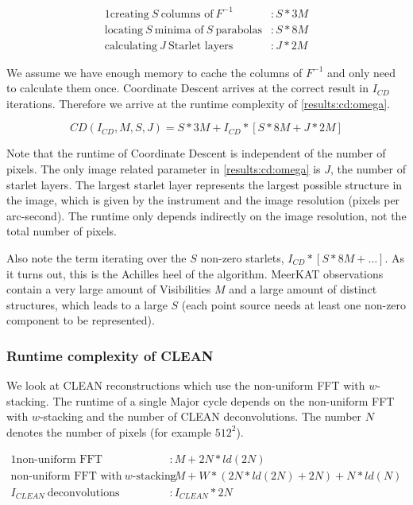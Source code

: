 \begin{alignat*}{1}
\text{creating} \:S\: \text{columns of}\: F^{-1} &: S*3M\\
\text{locating} \:S\: \text{minima of} \:S\: \text{parabolas} &: S*8M\\
\text{calculating} \:J\: \text{Starlet layers} &: J * 2M
\end{alignat*}

We assume we have enough memory to cache the columns of $F^{-1}$ and only need to calculate them once. Coordinate Descent arrives at the correct result in $I_{CD}$ iterations. Therefore we arrive at the runtime complexity of \eqref{results:cd:omega}.

\begin{equation}\label{results:cd:omega}
CD(I_{CD}, M, S, J) = S*3M + I_{CD} * [S * 8M + J * 2M]
\end{equation}

Note that the runtime of Coordinate Descent is independent of the number of pixels. The only image related parameter in \eqref{results:cd:omega} is $J$, the number of starlet layers. The largest starlet layer represents the largest possible structure in the image, which is given by the instrument and the image resolution (pixels per arc-second). The runtime only depends indirectly on the image resolution, not the total number of pixels.

Also note the term iterating over the $S$ non-zero starlets, $ I_{CD} * [S * 8M +\ldots]$. As it turns out, this is the Achilles heel of the algorithm. MeerKAT observations contain a very large amount of Visibilities $M$ and a large amount of distinct structures, which leads to a large $S$ (each point source needs at least one non-zero component to be represented). 

\subsubsection{Runtime complexity of CLEAN}
We look at CLEAN reconstructions which use the non-uniform FFT with $w$-stacking. The runtime of a single Major cycle depends on the non-uniform FFT with $w$-stacking and the number of CLEAN deconvolutions. The number $N$ denotes the number of pixels (for example $512^2$).

\begin{alignat*}{1}
	\text{non-uniform FFT} &: M + 2N*ld(2N)\\
	\text{non-uniform FFT with} \:w\text{-stacking} &:M + W*(2N*ld(2N) + 2N) + N*ld(N)\\
	I_{CLEAN}\: \text{deconvolutions} &: I_{CLEAN}*2N
\end{alignat*}


